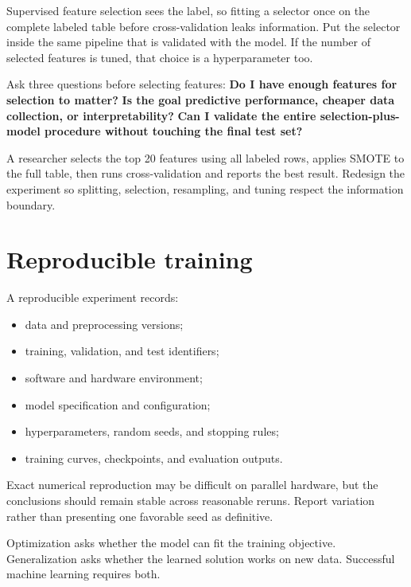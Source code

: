 \begin{pitfall}
Supervised feature selection sees the label, so fitting a selector once on the complete labeled table before cross-validation leaks information. Put the selector inside the same pipeline that is validated with the model. If the number of selected features is tuned, that choice is a hyperparameter too.
\end{pitfall}

\begin{keyidea}
Ask three questions before selecting features: \textbf{Do I have enough features for selection to matter?} \textbf{Is the goal predictive performance, cheaper data collection, or interpretability?} \textbf{Can I validate the entire selection-plus-model procedure without touching the final test set?}
\end{keyidea}

\begin{debugtask}
A researcher selects the top 20 features using all labeled rows, applies SMOTE to the full table, then runs cross-validation and reports the best result. Redesign the experiment so splitting, selection, resampling, and tuning respect the information boundary.
\end{debugtask}

\section{Reproducible training}

A reproducible experiment records:

\begin{itemize}
  \item data and preprocessing versions;
  \item training, validation, and test identifiers;
  \item software and hardware environment;
  \item model specification and configuration;
  \item hyperparameters, random seeds, and stopping rules;
  \item training curves, checkpoints, and evaluation outputs.
\end{itemize}

Exact numerical reproduction may be difficult on parallel hardware, but the conclusions should remain stable across reasonable reruns. Report variation rather than presenting one favorable seed as definitive.

\begin{keyidea}
Optimization asks whether the model can fit the training objective. Generalization asks whether the learned solution works on new data. Successful machine learning requires both.
\end{keyidea}

